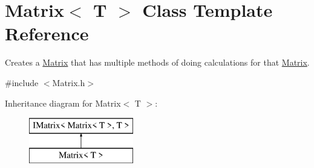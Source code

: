 \hypertarget{class_matrix}{}\section{Matrix$<$ T $>$ Class Template Reference}
\label{class_matrix}


Creates a \mbox{\hyperlink{class_matrix}{Matrix}} that has multiple methods of doing calculations for that \mbox{\hyperlink{class_matrix}{Matrix}}.  




{\ttfamily \#include $<$Matrix.\+h$>$}

Inheritance diagram for Matrix$<$ T $>$\+:\begin{figure}[H]
\begin{center}
\leavevmode
\includegraphics[height=2.000000cm]{class_matrix}
\end{center}
\end{figure}
